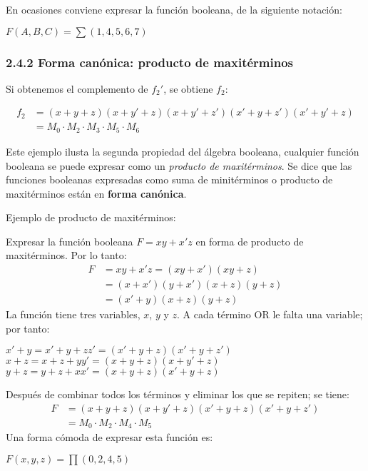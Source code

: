 En ocasiones conviene expresar la funci\'{o}n booleana, de la siguiente
notaci\'{o}n:
\begin{center}
    $F(A, B, C) = \sum(1, 4, 5, 6, 7)$
\end{center}

\subsubsection*{2.4.2 Forma can\'{o}nica: producto de maxit\'{e}rminos}
\begin{flushleft}
    Si obtenemos el complemento de $f_2'$, se obtiene $f_2$:
\end{flushleft}
\begin{align*}
    f_2 & = (x + y + z)(x + y' + z)(x + y' + z')(x' + y + z')(x' + y' + z) \\
        & = M_0 \cdot M_2 \cdot M_3 \cdot M_5 \cdot M_6
\end{align*}

Este ejemplo ilusta la segunda propiedad del \'{a}lgebra booleana, cualquier
funci\'{o}n booleana se puede expresar como un \textit{producto de
maxit\'{e}rminos}. Se dice que las funciones booleanas expresadas como suma de
minit\'{e}rminos o producto de maxit\'{e}rminos est\'{a}n en \textbf{forma
can\'{o}nica}.
\medbreak

Ejemplo de producto de maxit\'{e}rminos:
\begin{flushleft} Expresar la
    funci\'{o}n booleana $F = xy + x'z$ en forma de producto de maxit\'{e}rminos. Por lo tanto:
    \begin{align*}
        F & = xy + x'z = (xy + x')(xy + z)   \\
          & = (x + x')(y + x')(x + z)(y + z) \\
          & = (x' + y)(x + z)(y + z)
    \end{align*}
    La funci\'{o}n tiene tres variables, $x$, $y$ y $z$. A cada t\'{e}rmino OR le falta una variable; por tanto:
    \begin{center}
        $x' + y = x' + y + zz' = (x' + y + z)(x' + y + z')$ \\
        $x + z = x + z + yy' = (x + y + z)(x + y' + z)$ \\
        $y + z = y + z + xx' = (x + y + z)(x' + y + z)$
    \end{center}
    Despu\'{e}s de combinar todos los t\'{e}rminos y eliminar los que se repiten; se tiene:
    \begin{align*}
        F & = (x + y + z)(x + y' + z)(x' + y + z)(x' + y + z') \\
          & = M_0 \cdot M_2 \cdot M_4 \cdot  M_5
    \end{align*}
    Una forma c\'{o}moda de expresar esta funci\'{o}n es:
    \begin{center}
        $F(x, y, z) = \prod(0, 2, 4, 5)$
    \end{center}
\end{flushleft}


